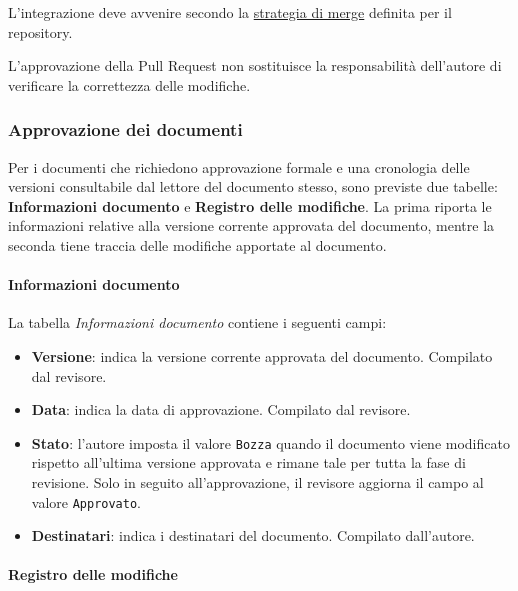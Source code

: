 \documentclass[11pt, a4paper]{article}
\begin{document}
\noindent L'integrazione deve avvenire secondo la \hyperref[subsec:pull-request-e-merge]{strategia di merge} definita per il repository.

L'approvazione della Pull Request non sostituisce la responsabilità dell'autore di verificare la correttezza delle modifiche.

\subsubsection{Approvazione dei documenti}

Per i documenti che richiedono approvazione formale e una cronologia delle versioni consultabile dal lettore del documento stesso, sono previste due tabelle: \textbf{Informazioni documento} e \textbf{Registro delle modifiche}. La prima riporta le informazioni relative alla versione corrente approvata del documento, mentre la seconda tiene traccia delle modifiche apportate al documento.

\paragraph{Informazioni documento}

La tabella \textit{Informazioni documento} contiene i seguenti campi:
\begin{itemize}
    \item \textbf{Versione}: indica la versione corrente approvata del documento. Compilato dal revisore.
    \item \textbf{Data}: indica la data di approvazione. Compilato dal revisore.
    \item \textbf{Stato}: l'autore imposta il valore \texttt{Bozza} quando il documento viene modificato rispetto all'ultima versione approvata e rimane tale per tutta la fase di revisione. Solo in seguito all'approvazione, il revisore aggiorna il campo al valore \texttt{Approvato}.
    \item \textbf{Destinatari}: indica i destinatari del documento. Compilato dall'autore.
\end{itemize}

\paragraph{Registro delle modifiche}
\end{document}
